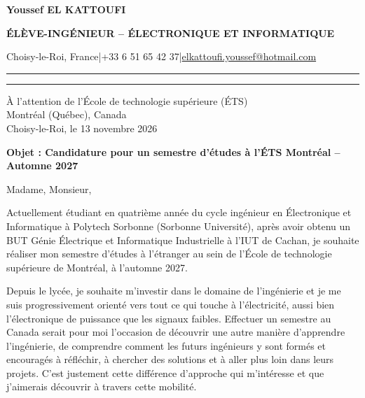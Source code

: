 \documentclass[10pt,a4paper]{article}
\begin{document}
{
{\fontsize{19.6}{21.5}\selectfont\bfseries\color{bleu}Youssef EL KATTOUFI}\par\vspace{2pt}
{\fontsize{9.8}{11}\selectfont\bfseries\color{rouge}ÉLÈVE-INGÉNIEUR -- ÉLECTRONIQUE ET INFORMATIQUE}\par\vspace{3.5pt}
{\fontsize{9.2}{10.2}\selectfont Choisy-le-Roi, France\quad\textcolor{gris}{|}\quad +33 6 51 65 42 37\quad\textcolor{gris}{|}\quad \href{mailto:elkattoufi.youssef@hotmail.com}{elkattoufi.youssef@hotmail.com}}\par}
\vspace{7pt}
\textcolor{rouge}{\rule{1.45cm}{1.65pt}}\hspace{1.5pt}\textcolor{gris!65}{\rule{\dimexpr\linewidth-1.65cm\relax}{.55pt}}\par
\vspace{6pt}

{\fontsize{9.35}{10.5}\selectfont\raggedleft
À l'attention de l'École de technologie supérieure (ÉTS)\\
Montréal (Québec), Canada\\[3pt]
Choisy-le-Roi, le 13 novembre 2026\par}
\vspace{5pt}
{\fontsize{10}{11.5}\selectfont\bfseries\color{bleu}Objet : Candidature pour un semestre d'études à l'ÉTS Montréal -- Automne 2027\par}
\vspace{3pt}

\fontsize{10.7}{12.35}\selectfont
Madame, Monsieur,

\justifying
Actuellement étudiant en quatrième année du cycle ingénieur en Électronique et Informatique à Polytech Sorbonne (Sorbonne Université), après avoir obtenu un BUT Génie Électrique et Informatique Industrielle à l'IUT de Cachan, je souhaite réaliser mon semestre d'études à l'étranger au sein de l'École de technologie supérieure de Montréal, à l'automne 2027.

Depuis le lycée, je souhaite m'investir dans le domaine de l'ingénierie et je me suis progressivement orienté vers tout ce qui touche à l'électricité, aussi bien l'électronique de puissance que les signaux faibles. Effectuer un semestre au Canada serait pour moi l'occasion de découvrir une autre manière d'apprendre l'ingénierie, de comprendre comment les futurs ingénieurs y sont formés et encouragés à réfléchir, à chercher des solutions et à aller plus loin dans leurs projets. C'est justement cette différence d'approche qui m'intéresse et que j'aimerais découvrir à travers cette mobilité.
\end{document}
